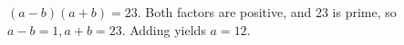 $(a-b)(a+b)=23$. Both factors are positive, and 23 is prime, so $a-b=1,a+b=23$. Adding yields $\boxed{a=12}$.
